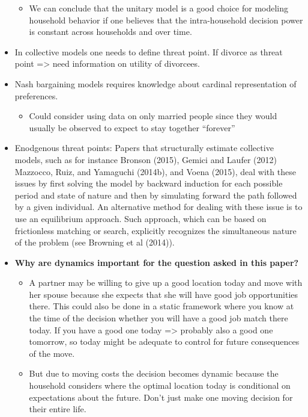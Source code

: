 \begin{itemize}
\begin{itemize}
\item We can conclude that the unitary model is a good choice for modeling household behavior if one believes that the intra-household decision power is constant across households and over time.
\end{itemize}
\item In collective models one needs to define threat point. If divorce as threat point => need information on utility of divorcees.
\item Nash bargaining models requires knowledge about cardinal representation of preferences.
\begin{itemize}
\item Could consider using data on only married people since they would usually be observed to expect to stay together ``forever''
\end{itemize}
\item Enodgenous threat points: Papers that structurally estimate collective models, such as for instance Bronson (2015), Gemici and
Laufer (2012) Mazzocco, Ruiz, and Yamaguchi (2014b), and Voena (2015), deal with these issues by first solving the model by backward induction for each possible period and state of nature and then by simulating forward the path followed by a given individual. An alternative method for dealing with these issue is to use an equilibrium approach. Such approach, which can be based on frictionless matching or search, explicitly recognizes the simultaneous nature of the problem (see Browning et al (2014)).
\item \textbf{Why are dynamics important for the question asked in this paper?}
\begin{itemize}
\item A partner may be willing to give up a good location today and move with her spouse because she expects that she will have good job opportunities there. This could also be done in a static framework where you know at the time of the decision whether you will have a good job match there today. If you have a good one today => probably also a good one tomorrow, so today might be adequate to control for future consequences of the move. 
\item But due to moving costs the decision becomes dynamic because the household considers where the optimal location today is conditional on expectations about the future. Don't just make one moving decision for their entire life.

\end{itemize}
\end{itemize}
